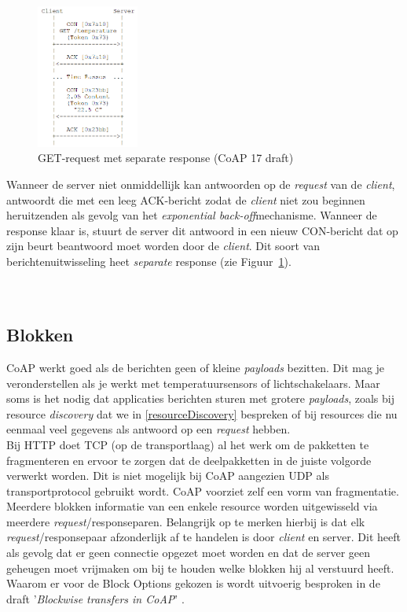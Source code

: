 \begin{figure}
\vspace{-40pt}
\includegraphics[width=0.3\textwidth]{fig/CoAPSeperateResponse}
\vspace{-30pt}
\caption{GET-request met separate response (CoAP 17 draft)}
\label{fig:SeparateResponse}
\vspace{-100pt}
\end{figure}
Wanneer de server niet onmiddellijk kan antwoorden op de \textit{request} van de \textit{client}, antwoordt die met een leeg ACK-bericht zodat de \textit{client} niet zou beginnen heruitzenden als gevolg van het \textit{exponential back-off}mechanisme. Wanneer de response klaar is, stuurt de server dit antwoord in een nieuw CON-bericht dat op zijn beurt beantwoord moet worden door de \textit{client}. Dit soort van berichtenuitwisseling heet \textit{separate} response (zie Figuur~\ref{fig:SeparateResponse}).
\\
\\
\\

\subsection{Blokken} \label{blocks}
CoAP werkt goed als de berichten geen of kleine \textit{payloads} bezitten. Dit mag je veronderstellen als je werkt met temperatuursensors of lichtschakelaars. Maar soms is het nodig dat applicaties berichten sturen met grotere \textit{payloads}, zoals bij resource \textit{discovery} dat we in \ref{resourceDiscovery} bespreken of bij resources die nu eenmaal veel gegevens als antwoord op een \textit{request} hebben.\\

Bij HTTP doet TCP (op de transportlaag) al het werk om de pakketten te fragmenteren en ervoor te zorgen dat de deelpakketten in de juiste volgorde verwerkt worden. Dit is niet mogelijk bij CoAP aangezien UDP als transportprotocol gebruikt wordt. CoAP voorziet zelf een vorm van fragmentatie. Meerdere blokken informatie van een enkele resource worden uitgewisseld via meerdere \textit{request}/responseparen. Belangrijk op te merken hierbij is dat elk \textit{request}/responsepaar afzonderlijk af te handelen is door \textit{client} en server. Dit heeft als gevolg dat er geen connectie opgezet moet worden en dat de server geen geheugen moet vrijmaken om bij te houden welke blokken hij al verstuurd heeft. Waarom er voor de Block Options gekozen is wordt uitvoerig besproken in de draft '\textit{Blockwise transfers in CoAP}' \cite{blockwiseTransfer}.

